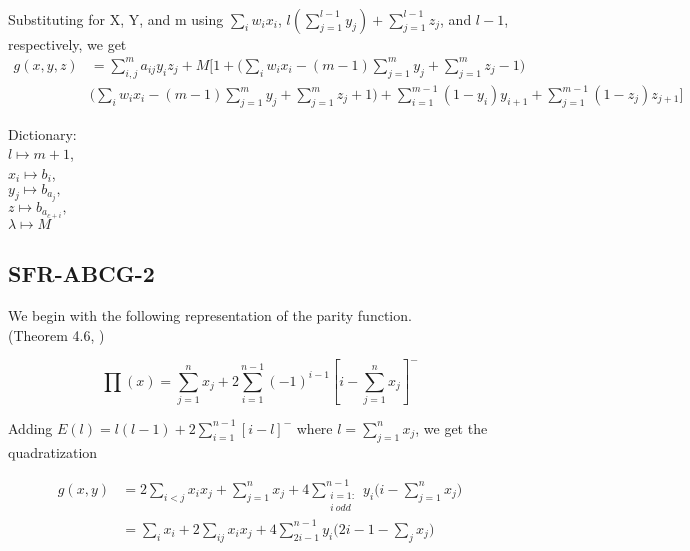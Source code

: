 \documentclass[a4paper,english,notitlepage,longbibliography,showpacs,preprintnumbers,amsmath,amssymb,aps,prx,nofootinbib,12pt,superscriptaddress]{revtex4-1}
\begin{document}
\noindent \\Substituting for X, Y, and m using $\sum_i w_ix_i$, $l\left(\sum_{j=1}^{l-1}y_j\right) + \sum_{j=1}^{l-1} z_j$, and $l-1$, respectively, we get
\begin{equation}
  \begin{split}
  \left.
  g(x,y,z)
  \right.
  &= \sum_{i,j}^{m}a_{ij}y_iz_j + M\Big[1 + \Big(\sum_i w_ix_i-(m-1)\sum_{j=1}^{m}y_j + \sum_{j=1}^{m} z_j-1\Big)\\
  &\Big(\sum_i w_ix_i-(m-1)\sum_{j=1}^{m}y_j + \sum_{j=1}^{m} z_j+1\Big)
  + \sum_{i=1}^{m-1}(1-y_i)y_{i+1} + \sum_{j=1}^{m-1}(1-z_j)z_{j+1}\Big]
  \end{split}
\end{equation}

Dictionary: \\
$l\mapsto m + 1$,\\
$x_i\mapsto b_i$, \\
$y_j\mapsto b_{a_j},$\\
$z\mapsto b_{a_{c+i}},$\\
$\lambda\mapsto M$


\subsection{SFR-ABCG-2}

We begin with the following representation of the parity function.
\\(Theorem 4.6, \cite{Anthony2014})

\begin{equation}
  \prod{(x)} = \sum_{j=1}^n x_j + 2\sum_{i=1}^{n-1}(-1)^{i-1}\left[i - \sum_{j=1}^{n}x_j\right]^-
\end{equation}

\noindent Adding $E(l) = l(l-1) + 2\sum_{i=1}^{n-1}\left[i-l\right]^-$ where $l = \sum_{j=1}^n x_j$, we get the quadratization

\begin{equation}
\begin{split}
  \left.
  g(x,y)
  \right.
  &= 2\sum_{i<j}x_ix_j + \sum_{j=1}^n x_j + 4\sum_{\substack{i = 1:\\ i\:odd}}^{n-1}y_i\Big(i - \sum_{j=1}^n x_j\Big)\\
  &= \sum_{i}x_i + 2\sum_{ij}x_ix_j + 4\sum_{2i-1}^{n-1}y_i\Big(2i - 1 - \sum_{j}x_j\Big)
  \end{split}
\end{equation}
\end{document}

